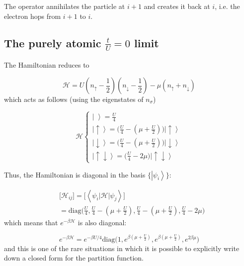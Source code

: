 \documentclass[10pt, twocolumn, twoside]{article}
\begin{document}
The operator annihilates the particle at $i+1$ and creates it back at $i$, i.e. the electron hops from $i+1$ to $i$.

\subsection{The purely atomic $\frac{t}{U} = 0$ limit}\paragraph{}

The Hamiltonian reduces to 

\begin{equation}
\mathcal{H} = U (n_\uparrow - \frac{1}{2} ) (n_\downarrow - \frac{1}{2} ) - \mu ( n_\uparrow + n_\downarrow )
\end{equation}
which acts as follows (using the eigenstates of $n_\sigma$)

\begin{equation}
\mathcal{H} \begin{cases}
\left| \,\, \right\rangle = \frac{U}{4} \\
\left| \uparrow \right\rangle = \bigg( \frac{U}{4} - (\mu + \frac{U}{2} ) \bigg) \left| \uparrow \right\rangle \\
\left| \downarrow \right\rangle = \bigg( \frac{U}{4} - (\mu + \frac{U}{2} ) \bigg) \left| \downarrow \right\rangle \\
\left| \uparrow \downarrow \right\rangle = \bigg( \frac{U}{4} - 2 \mu \bigg) \left| \uparrow \downarrow \right\rangle
\end{cases}
\end{equation}

Thus, the Hamiltonian is diagonal in the basis $\{\left| \psi_i \right\rangle \}$:

\begin{equation}
\begin{split}
&\bigg[ \mathcal{H}_{ij} \bigg] = \bigg[ \left\langle \psi_i \left| \mathcal{H} \right| \psi_j \right\rangle \bigg] \\
&= \text{diag}\bigg(\frac{U}{4}, \frac{U}{4} - (\mu + \frac{U}{2} ), \frac{U}{4} - (\mu + \frac{U}{2} ), \frac{U}{4} - 2 \mu \bigg)
\end{split}
\end{equation}
which means that $e^{-\beta \mathcal{H} }$ is also diagonal:

\begin{equation}
e^{-\beta \mathcal{H} } = e^{-\beta U / 4}  \text{diag}\bigg(1,  e^{\beta(\mu + \frac{U}{2})}, e^{\beta(\mu + \frac{U}{2})},  e^{2\beta \mu} \bigg)
\end{equation}
and this is one of the rare situations in which it is possible to explicitly write down a closed form for the partition function.
\end{document}
